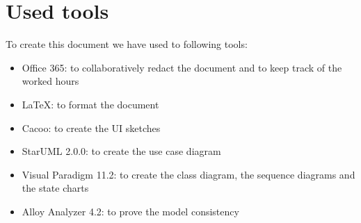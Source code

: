 \documentclass[10pt,a4paper,titlepage]{article}
\begin{document}
\section{Used tools}
To create this document we have used to following tools:
\begin{itemize}
\item Office 365: to collaboratively redact the document and to keep track of the worked hours
\item LaTeX: to format the document
\item Cacoo: to create the UI sketches
\item StarUML 2.0.0: to create the use case diagram
\item Visual Paradigm 11.2: to create the class diagram, the sequence diagrams and the state charts
\item Alloy Analyzer 4.2: to prove the model consistency
\end{itemize}

\clearpage
\tableofcontents
\end{document}
